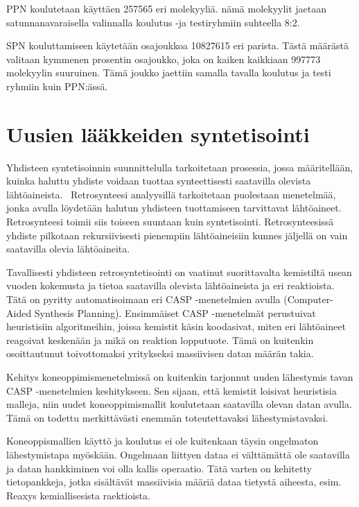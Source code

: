 \documentclass[finnish,twoside,censored,subject,sw-line]{HYthesisML}
\begin{document}
PPN koulutetaan käyttäen 257565 eri molekyyliä.
nämä molekyylit jaetaan satunnanavaraisella valinnalla koulutus -ja testiryhmiin suhteella 8:2.

SPN kouluttamiseen käytetään osajoukkoa 10827615 eri parista.
Tästä määrästä valitaan kymmenen prosentin osajoukko, joka on kaiken kaikkiaan 997773 molekyylin suuruinen.
Tämä joukko jaettiin samalla tavalla koulutus ja testi ryhmiin kuin PPN:ässä.

\chapter{Uusien lääkkeiden syntetisointi}

Yhdisteen syntetisoinnin suunnittelulla tarkoitetaan prosessia, jossa määritellään, kuinka haluttu yhdiste voidaan
tuottaa synteettisesti saatavilla olevista lähtöaineista.~\cite{ColeyConnorW2018MLiC} Retrosynteesi analyysillä
tarkoitetaan puolestaan menetelmää, jonka avulla löydetään halutun yhdisteen tuottamiseen tarvittavat lähtöaineet.
Retrosynteesi toimii siis toiseen suuntaan kuin syntetisointi. Retrosynteesissä yhdiste pilkotaan rekursiivisesti
pienempiin lähtöaineisiin kunnes jäljellä on vain saatavilla olevia lähtöaineita.

Tavallisesti yhdisteen retrosyntetisointi on vaatinut suorittavalta kemistiltä usean vuoden kokemusta ja tietoa
saatavilla olevista lähtöaineista ja eri reaktioista. Tätä on pyritty automatisoimaan eri CASP -menetelmien avulla (Computer-Aided Synthesis Planning).
Ensimmäiset CASP -menetelmät perustuivat heuristisiin algoritmeihin, joissa kemistit käsin koodasivat, miten eri lähtöaineet reagoivat keskenään ja
mikä on reaktion lopputuote. Tämä on kuitenkin osoittautunut toivottomaksi yritykseksi massiivisen datan määrän takia.

Kehitys koneoppimismenetelmissä on kuitenkin tarjonnut uuden lähestymis tavan CASP -menetelmien keshitykseen. Sen sijaan, että
kemistit loisivat heuristisia malleja, niin uudet koneoppimismallit koulutetaan saatavilla olevan datan avulla.
Tämä on todettu merkittävästi enemmän toteutettavaksi lähestymistavaksi.

Koneoppismallien käyttö ja koulutus ei ole kuitenkaan täysin ongelmaton lähestymistapa myöskään.
Ongelmaan liittyen dataa ei välttämättä ole saatavilla ja datan hankkiminen voi olla kallis operaatio.
Tätä varten on kehitetty tietopankkeja, jotka sisältävät massiivisia määriä dataa tietystä aiheesta, esim. Reaxys kemiallisesista raektioista.
\end{document}
